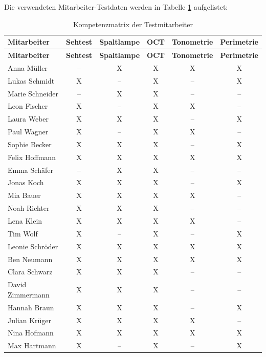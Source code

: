  Die verwendeten Mitarbeiter-Testdaten werden in Tabelle \ref{tab:kompetenzmatrix} aufgelistet:
\begin{longtable}{lccccc}
	\caption{Kompetenzmatrix der Testmitarbeiter}
	\label{tab:kompetenzmatrix}\\
	
	\toprule
	\textbf{Mitarbeiter} & \textbf{Sehtest} & \textbf{Spaltlampe} & \textbf{OCT} & \textbf{Tonometrie} & \textbf{Perimetrie} \\
	\midrule
	\endfirsthead
	
	\toprule
	\textbf{Mitarbeiter} & \textbf{Sehtest} & \textbf{Spaltlampe} & \textbf{OCT} & \textbf{Tonometrie} & \textbf{Perimetrie} \\
	\midrule
	\endhead
	
	Anna Müller        & -- & X & X & X & X \\
	Lukas Schmidt      & X & -- & X & -- & X \\
	Marie Schneider    & -- & X & X & -- & -- \\
	Leon Fischer       & X & -- & X & X & -- \\
	Laura Weber        & X & X & X & -- & X \\
	Paul Wagner        & X & -- & X & X & -- \\
	Sophie Becker      & X & X & X & -- & X \\
	Felix Hoffmann     & X & X & X & X & X \\
	Emma Schäfer       & -- & X & X & -- & -- \\
	Jonas Koch         & X & X & X & -- & X \\
	Mia Bauer          & X & X & X & X & -- \\
	Noah Richter       & X & X & X & -- & -- \\
	Lena Klein         & X & X & X & X & -- \\
	Tim Wolf           & X & -- & X & -- & X \\
	Leonie Schröder    & X & X & X & X & X \\
	Ben Neumann        & X & X & X & X & X \\
	Clara Schwarz      & X & X & X & -- & -- \\
	David Zimmermann   & X & X & X & -- & -- \\
	Hannah Braun       & X & X & X & -- & X \\
	Julian Krüger      & X & X & X & X & -- \\
	Nina Hofmann       & X & X & X & X & X \\
	Max Hartmann       & X & -- & X & -- & X \\

\end{longtable}
